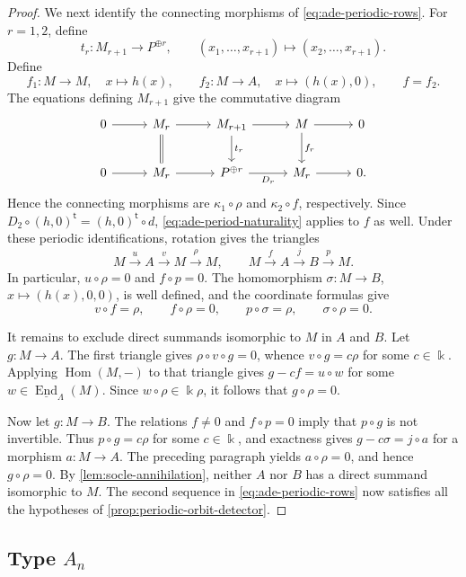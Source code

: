 \documentclass[a4paper,11pt,reqno]{amsart}
\theoremstyle{definition}
\theoremstyle{plain}
\numberwithin{equation}{section}
\newcommand{\Hom}{\operatorname{Hom}}
\newcommand{\End}{\operatorname{End}}
\newcommand{\kk}{\Bbbk}
\begin{document}
\begin{proof}
We next identify the connecting morphisms of
\eqref{eq:ade-periodic-rows}.  For \(r=1,2\), define
\[
 t_r:M_{r+1}\longrightarrow P^{\oplus r},\qquad
 (x_1,\ldots,x_{r+1})\longmapsto(x_2,\ldots,x_{r+1}).
\]
Define
\[
 f_1:M\to M,\quad x\longmapsto h(x),\qquad
 f_2:M\to A,\quad x\longmapsto(h(x),0),
 \qquad f=f_2.
\]
The equations defining \(M_{r+1}\) give the commutative diagram
\[
\begin{tikzcd}[column sep=2.8em,row sep=2.1em]
0\arrow[r]&M_r\arrow[r]\arrow[d,equal]
 &M_{r+1}\arrow[r]\arrow[d,"t_r"]
 &M\arrow[r]\arrow[d,"f_r"]&0\\
0\arrow[r]&M_r\arrow[r]&P^{\oplus r}\arrow[r,"D_r"']
 &M_r\arrow[r]&0.
\end{tikzcd}
\]
Hence the connecting morphisms are \(\kappa_1\circ\rho\) and
\(\kappa_2\circ f\), respectively.  Since
\(D_2\circ(h,0)^{\mathsf t}=(h,0)^{\mathsf t}\circ d\),
\eqref{eq:ade-period-naturality} applies to \(f\) as well.
Under these periodic identifications, rotation gives the triangles
\[
 M\xrightarrow{u}A\xrightarrow{v}M\xrightarrow{\rho}M,
 \qquad M\xrightarrow{f}A\xrightarrow{j}B\xrightarrow{p}M.
\]
In particular, \(u\circ\rho=0\) and \(f\circ p=0\).
The homomorphism
\(\sigma:M\to B\), \(x\mapsto(h(x),0,0)\), is well defined,
and the coordinate formulas give
\[
 v\circ f=\rho,\qquad f\circ\rho=0,\qquad
 p\circ\sigma=\rho,\qquad\sigma\circ\rho=0.
\]

It remains to exclude direct summands isomorphic to \(M\) in
\(A\) and \(B\).  Let \(g:M\to A\).  The first triangle gives
\(\rho\circ v\circ g=0\), whence \(v\circ g=c\rho\) for
some \(c\in\kk\).  Applying \(\Hom(M,-)\) to that triangle
gives \(g-cf=u\circ w\) for some
\(w\in\underline{\End}_\Lambda(M)\).  Since
\(w\circ\rho\in\kk\rho\), it follows that \(g\circ\rho=0\).

Now let \(g:M\to B\).  The relations \(f\ne0\) and
\(f\circ p=0\) imply that \(p\circ g\) is not invertible.
Thus \(p\circ g=c\rho\) for some \(c\in\kk\), and
exactness gives \(g-c\sigma=j\circ a\) for a morphism
\(a:M\to A\).  The preceding paragraph yields
\(a\circ\rho=0\), and hence \(g\circ\rho=0\).
By \cref{lem:socle-annihilation}, neither \(A\) nor \(B\) has
a direct summand isomorphic to \(M\).
The second sequence in \eqref{eq:ade-periodic-rows} now satisfies
all the hypotheses of \cref{prop:periodic-orbit-detector}.
\end{proof}
\subsection{Type \texorpdfstring{$A_n$}{An}}
\end{document}
